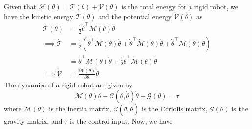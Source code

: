 Given that \( \mathcal{H}(\theta)=\mathcal{T}(\theta)+\mathcal{V}(\theta) \) is the total energy for a rigid robot, we have the kinetic energy \( \mathcal{T}(\theta) \) and the potential energy \( \mathcal{V}(\theta) \) as
\begin{align*}
    \mathcal{T}(\theta)
     & =
    \frac{1}{2} \dot{\theta}^{\top} \mathcal{M}(\theta) \dot{\theta}
    \\
    \implies
    \dot{\mathcal{T}}
     & =
    \frac{1}{2} \left(
    \ddot{\theta}^{\top} \mathcal{M}(\theta) \dot{\theta}
    +
    \dot{\theta}^{\top} \dot{\mathcal{M}}(\theta) \dot{\theta}
    +
    \dot{\theta}^{\top} \mathcal{M}(\theta) \ddot{\theta}
    \right)
    \\ & =
    \dot{\theta}^{\top} \mathcal{M}(\theta) \ddot{\theta}
    +
    \frac{1}{2}
    \dot{\theta}^{\top} \dot{\mathcal{M}}(\theta) \dot{\theta}
    \\
    \implies
    \dot{\mathcal{V}}
     & =
    \frac{\partial \mathcal{V}(\theta)}{\partial \theta} \dot{\theta}
\end{align*}
The dynamics of a rigid robot are given by
\begin{equation*}
    \mathcal{M}(\theta) \ddot{\theta}
    +
    \mathcal{C}(\theta, \dot{\theta}) \dot{\theta}
    +
    \mathcal{G}(\theta)
    =
    \tau
\end{equation*}
where \( \mathcal{M}(\theta) \) is the inertia matrix, \( \mathcal{C}(\theta, \dot{\theta}) \) is the Coriolis matrix, \( \mathcal{G}(\theta) \) is the gravity matrix, and \( \tau \) is the control input.
Now, we have
